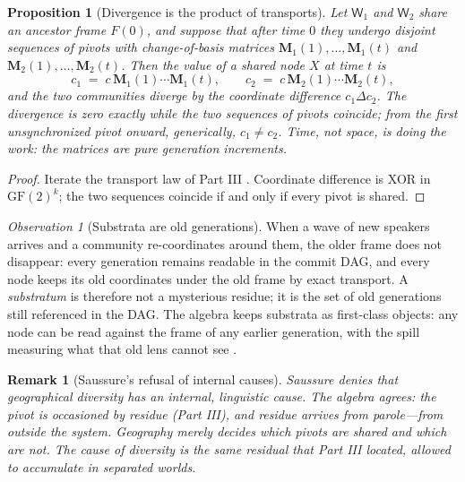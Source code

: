 \documentclass[11pt,a4paper]{article}
\newtheorem{proposition}[principle]{Proposition}
\newtheorem{remark}[principle]{Remark}
\theoremstyle{remark}
\newtheorem{observation}[principle]{Observation}
\newcommand{\xor}{\ensuremath{\Delta}}                   %
\newcommand{\Change}{\ensuremath{\mathbf{M}}}            %
\newcommand{\World}{\ensuremath{\mathsf{W}}}             %
\begin{document}
\begin{proposition}[Divergence is the product of transports]
\label{prop:divergence}
Let $\World_1$ and $\World_2$ share an ancestor frame $F(0)$, and suppose
that after time $0$ they undergo disjoint sequences of pivots with
change-of-basis matrices $\Change_1(1),\dots,\Change_1(t)$ and
$\Change_2(1),\dots,\Change_2(t)$. Then the value of a shared node $X$ at
time $t$ is
\[
  c_1 \;=\; c \,\Change_1(1)\cdots \Change_1(t),
  \qquad
  c_2 \;=\; c \,\Change_2(1)\cdots \Change_2(t),
\]
and the two communities diverge by the coordinate difference
$c_1 \xor c_2$. The divergence is zero exactly while the two sequences of
pivots coincide; from the first unsynchronized pivot onward, generically,
$c_1 \neq c_2$. Time, not space, is doing the work: the matrices are pure
generation increments.
\end{proposition}

\begin{proof}
Iterate the transport law of Part III \cite{part3}. Coordinate difference is
XOR in $\mathrm{GF}(2)^k$; the two sequences coincide if and only if every
pivot is shared.
\end{proof}

\begin{observation}[Substrata are old generations]
\label{obs:substratum}
When a wave of new speakers arrives and a community re-coordinates around
them, the older frame does not disappear: every generation remains readable
in the commit DAG, and every node keeps its old coordinates under the old
frame by exact transport. A \emph{substratum} is therefore not a mysterious
residue; it is the set of old generations still referenced in the DAG. The
algebra keeps substrata as first-class objects: any node can be read against
the frame of any earlier generation, with the spill measuring what that old
lens cannot see \cite{state2026}.
\end{observation}

\begin{remark}[Saussure's refusal of internal causes]
Saussure denies that geographical diversity has an internal, linguistic
cause. The algebra agrees: the pivot is occasioned by residue (Part III), and
residue arrives from parole---from outside the system. Geography merely
decides which pivots are shared and which are not. The cause of diversity is
the same residual that Part III located, allowed to accumulate in separated
worlds.
\end{remark}

\end{document}
